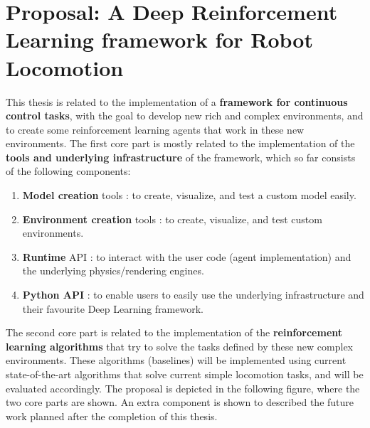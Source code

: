 
\chapter{Proposal: A Deep Reinforcement Learning framework for Robot Locomotion}
\label{ch:proposal}

This thesis is related to the implementation of a \textbf{framework for continuous control
tasks}, with the goal to develop new rich and complex environments, and to create some 
reinforcement learning agents that work in these new environments. 
The first core part is mostly related to the implementation of the \textbf{tools and underlying
infrastructure} of the framework, which so far consists of the following components:

\begin{enumerate}
    \item \textbf{Model creation} tools : to create, visualize, and test a custom model easily.
    \item \textbf{Environment creation} tools : to create, visualize, and test custom environments.
    \item \textbf{Runtime} API : to interact with the user code (agent implementation) and the underlying physics/rendering engines.
    \item \textbf{Python API} : to enable users to easily use the underlying infrastructure and their favourite Deep Learning framework.
\end{enumerate}

The second core part is related to the implementation of the \textbf{reinforcement learning algorithms}
that try to solve the tasks defined by these new complex environments. These algorithms (baselines) will be implemented
using current state-of-the-art algorithms that solve current simple locomotion tasks, and will be evaluated
accordingly. The proposal is depicted in the following figure, where the two core parts are shown. An extra
component is shown to described the future work planned after the completion of this thesis.


